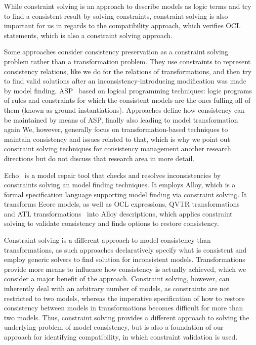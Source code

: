 While constraint solving is an approach to describe models as logic terms and try to find a consistent result by solving constraints, constraint solving is also important for us in regards to the compatibility approach, which verifies OCL statements, which is also a constraint solving approach.

Some approaches consider consistency preservation as a constraint solving problem rather than a transformation problem.
They use constraints to represent consistency relations, like we do for the relations of transformations, and then try to find valid solutions after an inconsistency-introducing modification was made by model finding.
\gls{ASP}~\cite{cicchetti2006asp-EDOCW,eramo2008asp-EDOCW} based on logical programming techniques: logic programs of rules and constraints for which the consistent models are the ones fulling all of them (known as ground instantiations).
Approaches define how consistency can be maintained by means of ASP, finally also leading to model transformation again
We, however, generally focus on transformation-based techniques to maintain consistency and issues related to that, which is why we point out constraint solving techniques for consistency management another research directions but do not discuss that research area in more detail.

Echo~\cite{macedo2013echo-ASE} is a model repair tool that checks and resolves inconsistencies by constraints solving an model finding techniques.
It employs Alloy, which is a formal specification language supporting model finding via constraint solving.
It transforms Ecore models, as well as \gls{OCL} expressions, \gls{QVTR} transformations~\cite{macedo2013qvtrAlloy-FASE} and \gls{ATL} transformations~\cite{macedo2016qvtAtlAlloy-SoSym} into Alloy descriptions, which applies constraint solving to validate consistency and finds options to restore consistency.

Constraint solving is a different approach to model consistency than transformations, as such approaches declaratively specify what is consistent and employ generic solvers to find solution for inconsistent models.
Transformations provide more means to influence how consistency is actually achieved, which we consider a major benefit of the approach.
Constraint solving, however, can inherently deal with an arbitrary number of models, as constraints are not restricted to two models, whereas the imperative specification of how to restore consistency between models in transformations becomes difficult for more than two models.
Thus, constraint solving provides a different approach to solving the underlying problem of model consistency, but is also a foundation of our approach for identifying compatibility, in which constraint validation is used.



